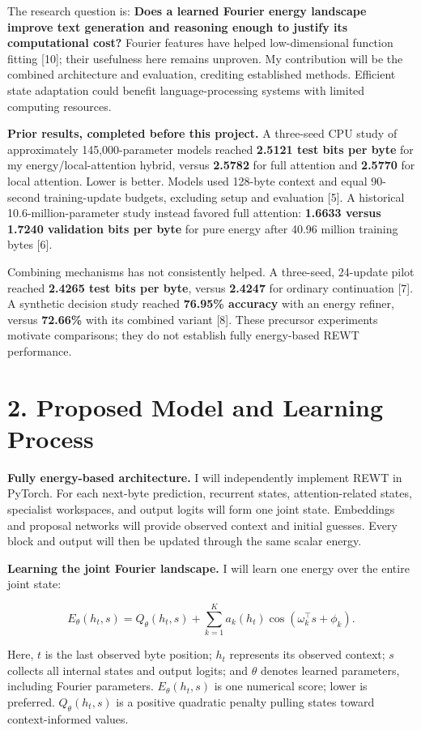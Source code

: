 \documentclass[11pt,letterpaper]{article}
\begin{document}
The research question is: \textbf{Does a learned Fourier energy landscape improve text generation and reasoning enough to justify its computational cost?} Fourier features have helped low-dimensional function fitting [10]; their usefulness here remains unproven. My contribution will be the combined architecture and evaluation, crediting established methods. Efficient state adaptation could benefit language-processing systems with limited computing resources.

\textbf{Prior results, completed before this project.} A three-seed CPU study of approximately 145,000-parameter models reached \textbf{2.5121 test bits per byte} for my energy/local-attention hybrid, versus \textbf{2.5782} for full attention and \textbf{2.5770} for local attention. Lower is better. Models used 128-byte context and equal 90-second training-update budgets, excluding setup and evaluation [5]. A historical 10.6-million-parameter study instead favored full attention: \textbf{1.6633 versus 1.7240 validation bits per byte} for pure energy after 40.96 million training bytes [6].

Combining mechanisms has not consistently helped. A three-seed, 24-update pilot reached \textbf{2.4265 test bits per byte}, versus \textbf{2.4247} for ordinary continuation [7]. A synthetic decision study reached \textbf{76.95\% accuracy} with an energy refiner, versus \textbf{72.66\%} with its combined variant [8]. These precursor experiments motivate comparisons; they do not establish fully energy-based REWT performance.

\newpage
\section*{2. Proposed Model and Learning Process}

\textbf{Fully energy-based architecture.} I will independently implement REWT in PyTorch. For each next-byte prediction, recurrent states, attention-related states, specialist workspaces, and output logits will form one joint state. Embeddings and proposal networks will provide observed context and initial guesses. Every block and output will then be updated through the same scalar energy.

\textbf{Learning the joint Fourier landscape.} I will learn one energy over the entire joint state:

\[
E_\theta(h_t,s)=Q_\theta(h_t,s)+\sum_{k=1}^{K}a_k(h_t)\cos(\omega_k^\top s+\phi_k).
\]

Here, \(t\) is the last observed byte position; \(h_t\) represents its observed context; \(s\) collects all internal states and output logits; and \(\theta\) denotes learned parameters, including Fourier parameters. \(E_\theta(h_t,s)\) is one numerical score; lower is preferred. \(Q_\theta(h_t,s)\) is a positive quadratic penalty pulling states toward context-informed values.
\end{document}
